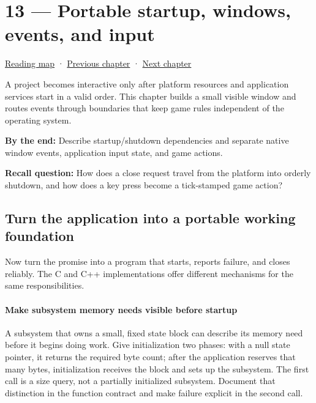 \hypertarget{05-engine-i-ch013}{}
\section{13 --- Portable startup, windows, events, and input}\label{portable-startup-windows-events-and-input}

\href{Chapter\%20Edition/03\%20-\%20Game\%20Engine/00\%20-\%20Reading\%20Map}{Reading map} · \hyperref[05-engine-i-ch012]{Previous chapter} · \hyperref[05-engine-i-ch014]{Next chapter}

A project becomes interactive only after platform resources and application services start in a valid order. This chapter builds a small visible window and routes events through boundaries that keep game rules independent of the operating system.

\textbf{By the end:} Describe startup/shutdown dependencies and separate native window events, application input state, and game actions.

\textbf{Recall question:} How does a close request travel from the platform into orderly shutdown, and how does a key press become a tick-stamped game action?

\subsection{Turn the application into a portable working foundation}\label{turn-the-application-into-a-portable-working-foundation}

Now turn the promise into a program that starts, reports failure, and closes reliably. The C and C++ implementations offer different mechanisms for the same responsibilities.

\paragraph{Make subsystem memory needs visible before startup}\label{make-subsystem-memory-needs-visible-before-startup}

A subsystem that owns a small, fixed state block can describe its memory need before it begins doing work. Give initialization two phases: with a null state pointer, it returns the required byte count; after the application reserves that many bytes, initialization receives the block and sets up the subsystem. The first call is a size query, not a partially initialized subsystem. Document that distinction in the function contract and make failure explicit in the second call.

